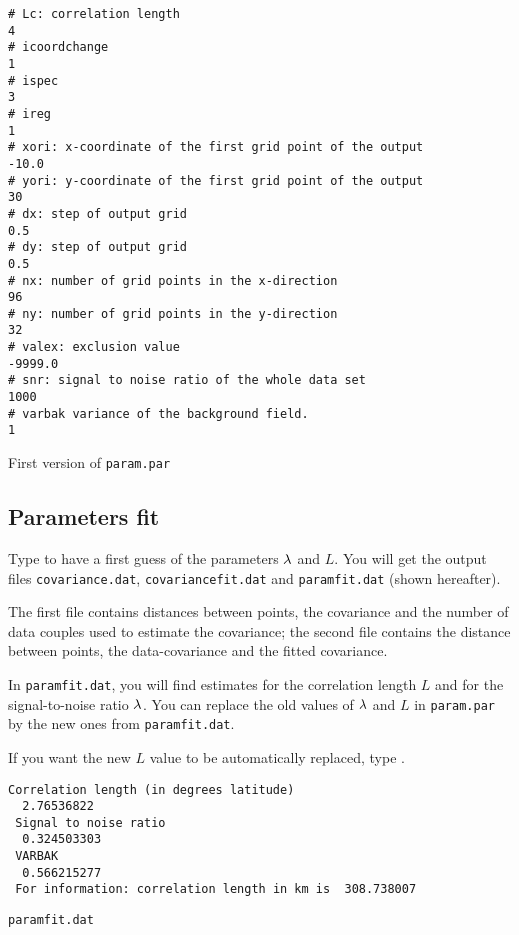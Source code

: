 \begin{exfile}[htpb]
\begin{footnotesize}
\begin{verbatim}
# Lc: correlation length 
4
# icoordchange 
1
# ispec 
3
# ireg 
1
# xori: x-coordinate of the first grid point of the output
-10.0
# yori: y-coordinate of the first grid point of the output
30
# dx: step of output grid
0.5
# dy: step of output grid
0.5
# nx: number of grid points in the x-direction
96
# ny: number of grid points in the y-direction
32
# valex: exclusion value
-9999.0
# snr: signal to noise ratio of the whole data set
1000
# varbak variance of the background field. 
1
\end{verbatim}
\end{footnotesize}
\caption{First version of \texttt{param.par}\label{paramfileCL}}
\end{exfile}


\subsection{Parameters fit}

Type  to have a first guess of the parameters $\lambda$ and $L$. You will get the output files \texttt{covariance.dat}, \texttt{covariancefit.dat} and  \texttt{paramfit.dat}  (shown hereafter). 

The first file contains distances between points, the covariance and the number of data couples used to estimate the covariance; the second file contains the distance between points, the data-covariance and the fitted covariance. 

In \texttt{paramfit.dat}, you will find estimates for the correlation length $L$ and for the signal-to-noise ratio $\lambda$. You can replace the old values of $\lambda$ and $L$ in \texttt{param.par} by the new ones from \texttt{paramfit.dat}.

If you want the new $L$ value to be automatically replaced, type .

\begin{exfile}[H]
\begin{footnotesize}
\begin{verbatim}
Correlation length (in degrees latitude)
  2.76536822
 Signal to noise ratio
  0.324503303
 VARBAK
  0.566215277
 For information: correlation length in km is  308.738007
\end{verbatim}
\end{footnotesize}
\caption{\texttt{paramfit.dat}}
\end{exfile}



